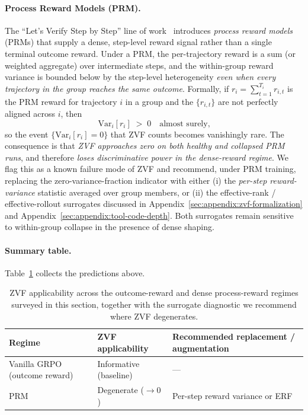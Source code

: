 \paragraph{Process Reward Models (PRM).}
The ``Let's Verify Step by Step'' line of work~\cite{lightman2023prm}
introduces \emph{process reward models} (PRMs) that supply a dense, step-level
reward signal rather than a single terminal outcome reward. Under a PRM, the
per-trajectory reward is a sum (or weighted aggregate) over intermediate
steps, and the within-group reward variance is bounded below by the
step-level heterogeneity \emph{even when every trajectory in the group reaches
the same outcome}. Formally, if $r_i = \sum_{t=1}^{T_i} r_{i,t}$ is the PRM
reward for trajectory $i$ in a group and the $\{r_{i,t}\}$ are not perfectly
aligned across $i$, then
\begin{equation}
\mathrm{Var}_i\!\left[r_i\right] \;>\; 0
\quad\text{almost surely,}
\end{equation}
so the event $\{\mathrm{Var}_i[r_i] = 0\}$ that ZVF counts becomes vanishingly
rare. The consequence is that \emph{ZVF approaches zero on both healthy and
collapsed PRM runs}, and therefore \emph{loses discriminative power in the
dense-reward regime}. We flag this as a known failure mode of ZVF and
recommend, under PRM training, replacing the zero-variance-fraction indicator
with either (i) the \emph{per-step reward-variance} statistic averaged over
group members, or (ii) the effective-rank / effective-rollout surrogates
discussed in Appendix~\ref{sec:appendix:zvf-formalization} and
Appendix~\ref{sec:appendix:tool-code-depth}. Both surrogates remain
sensitive to within-group collapse in the presence of dense shaping.

\paragraph{Summary table.}
Table~\ref{tab:ext:zvf-applicability} collects the predictions above.

\begin{table}[h]
\centering
\small
\begin{tabular}{@{}lll@{}}
\toprule
Regime & ZVF applicability & Recommended replacement / augmentation \\
\midrule
Vanilla GRPO (outcome reward) & Informative (baseline)   & --- \\
PRM~\cite{lightman2023prm}    & Degenerate ($\to 0$)     & Per-step reward variance or ERF \\
\bottomrule
\end{tabular}
\caption{ZVF applicability across the outcome-reward and dense process-reward
regimes surveyed in this section, together with the surrogate diagnostic we
recommend where ZVF degenerates.}
\label{tab:ext:zvf-applicability}
\end{table}

